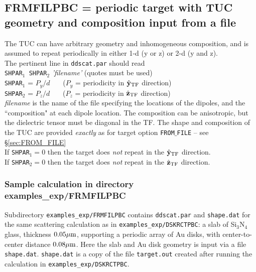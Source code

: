\subsection{ FRMFILPBC = periodic target with TUC geometry and composition
            input from a file
            \label{sec:FRMFILPBC}}
        The TUC can have arbitrary geometry and inhomogeneous
        composition, and is assumed to repeat periodically in either 
        1-d (y or z) or 2-d (y and z).\\
        The pertinent line in {\tt ddscat.par} should read\\
        {\tt SHPAR$_1$ SHPAR$_2$} {\it 'filename'} (quotes must be used)\\
        {\tt SHPAR}$_1$ = $P_y/d$~~~ 
            ($P_y$ = periodicity in $\hat{\bf y}_{\rm TF}$ direction)\\
        {\tt SHPAR}$_2$ = $P_z/d$~~~
            ($P_z$ = periodicity in $\hat{\bf z}_{\rm TF}$ direction)\\
        {\it filename} is the name of the file specifying the locations
        of the dipoles, and the ``composition" at each dipole location.  The
        composition can be anisotropic, but the dielectric tensor must
        be diagonal in the TF.  The shape and composition of the TUC
        are provided {\it exactly} as for target option {\tt FROM$\_$FILE}
        -- see \S\ref{sec:FROM_FILE}\\
        If {\tt SHPAR}$_1=0$ then the target does {\it not} repeat in the
            $\hat{\bf y}_{\rm TF}$ direction.\\
        If {\tt SHPAR}$_2=0$ then the target does {\it not} repeat in the
            $\hat{\bf z}_{\rm TF}$ direction.\\

\subsubsection{\bf Sample calculation in directory examples\_exp/FRMFILPBC}

Subdirectory {\tt examples\_exp/FRMFILPBC} contains {\tt ddscat.par}
and {\tt shape.dat} for the same scattering calculation as in 
{\tt examples\_exp/DSKRCTPBC}: a slab of Si$_3$N$_4$ glass, thickness
$0.05{\mu{\rm m}}$, supporting a periodic array of Au disks, with center-to-center
distance $0.08{\mu{\rm m}}$.  Here the slab and Au disk
geometry is input via a file {\tt shape.dat}.  {\tt shape.dat} is
a copy of the file {\tt target.out} created after running the
calculation in {\tt examples\_exp/DSKRCTPBC}.

